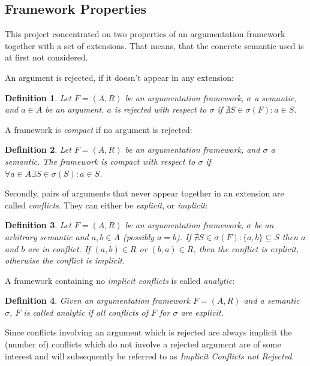 \documentclass[parskip=half]{scrartcl}
\newtheorem{definition}{Definition}
\begin{document}
\subsection{Framework Properties} \label{framework_props}
This project concentrated on two properties of an argumentation framework
together with a set of extensions. That means, that the concrete semantic used
is at first not considered.

An argument is rejected, if it doesn't appear in any extension:

\begin{definition}
Let $F=(A,R)$ be an argumentation framework, $\sigma$ a semantic, and $a\in A$
be an argument. $a$ is \emph{rejected} with respect to $\sigma$ if $\nexists
S\in\sigma(F): a\in S$.
\end{definition}

A framework is \emph{compact} if no argument is rejected:

\begin{definition}
Let $F=(A,R)$ be an argumentation framework, and $\sigma$ a semantic.  The
framework is \emph{compact} with respect to $\sigma$ if $\forall a\in A\exists
S\in\sigma(S):a\in S$.
\end{definition}

Secondly, pairs of arguments that never appear together in an extension
are called \emph{conflicts}. They can either be \emph{explicit}, or
\emph{implicit}:
\begin{definition}
  Let $F=(A,R)$ be an argumentation framework, $\sigma$ be an arbitrary semantic
  and $a, b\in A$ (possibly $a = b$). If $\nexists S \in \sigma(F): \{a,b\}
  \subseteq S$ then $a$ and $b$ are in \emph{conflict}. If $(a, b) \in R$ or
  $(b, a)\in R$, then the conflict is \emph{explicit}, otherwise the conflict is
  \emph{implicit}.
\end{definition}

A framework containing no \emph{implicit conflicts} is called \emph{analytic}:

\begin{definition}
Given an argumentation framework $F=(A,R)$ and a semantic $\sigma$, $F$ is
called \emph{analytic} if all conflicts of $F$ for $\sigma$ are explicit.
\end{definition}

Since conflicts involving an argument which is rejected are always implicit the
(number of) conflicts which do not involve a rejected argument are of some
interest and will subsequently be referred to as \emph{Implicit Conflicts not
Rejected}.
\end{document}
